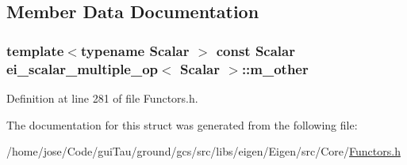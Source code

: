 \subsection{Member Data Documentation}
\hypertarget{structei__scalar__multiple__op_a73883bda19d9ddac9f20e61332e25897}{
\subsubsection[{m\-\_\-other}]{\setlength{\rightskip}{0pt plus 5cm}template$<$typename Scalar $>$ const Scalar {\bf ei\-\_\-scalar\-\_\-multiple\-\_\-op}$<$ Scalar $>$\-::m\-\_\-other}}\label{structei__scalar__multiple__op_a73883bda19d9ddac9f20e61332e25897}


Definition at line 281 of file Functors.\-h.



The documentation for this struct was generated from the following file\-:\begin{DoxyCompactItemize}
\item 
/home/jose/\-Code/gui\-Tau/ground/gcs/src/libs/eigen/\-Eigen/src/\-Core/\hyperlink{_core_2_functors_8h}{Functors.\-h}\end{DoxyCompactItemize}
